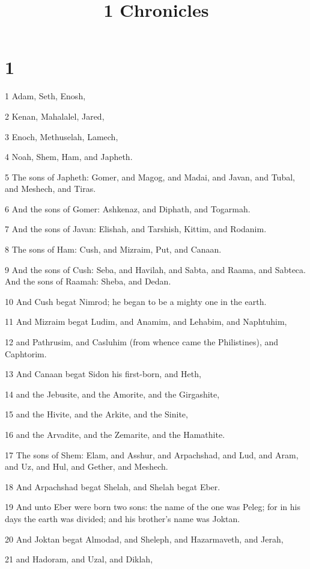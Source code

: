 

\title{1 Chronicles}

\chapter{1}

\par 1 Adam, Seth, Enosh,
\par 2 Kenan, Mahalalel, Jared,
\par 3 Enoch, Methuselah, Lamech,
\par 4 Noah, Shem, Ham, and Japheth.
\par 5 The sons of Japheth: Gomer, and Magog, and Madai, and Javan, and Tubal, and Meshech, and Tiras.
\par 6 And the sons of Gomer: Ashkenaz, and Diphath, and Togarmah.
\par 7 And the sons of Javan: Elishah, and Tarshish, Kittim, and Rodanim.
\par 8 The sons of Ham: Cush, and Mizraim, Put, and Canaan.
\par 9 And the sons of Cush: Seba, and Havilah, and Sabta, and Raama, and Sabteca. And the sons of Raamah: Sheba, and Dedan.
\par 10 And Cush begat Nimrod; he began to be a mighty one in the earth.
\par 11 And Mizraim begat Ludim, and Anamim, and Lehabim, and Naphtuhim,
\par 12 and Pathrusim, and Casluhim (from whence came the Philistines), and Caphtorim.
\par 13 And Canaan begat Sidon his first-born, and Heth,
\par 14 and the Jebusite, and the Amorite, and the Girgashite,
\par 15 and the Hivite, and the Arkite, and the Sinite,
\par 16 and the Arvadite, and the Zemarite, and the Hamathite.
\par 17 The sons of Shem: Elam, and Asshur, and Arpachshad, and Lud, and Aram, and Uz, and Hul, and Gether, and Meshech.
\par 18 And Arpachshad begat Shelah, and Shelah begat Eber.
\par 19 And unto Eber were born two sons: the name of the one was Peleg; for in his days the earth was divided; and his brother's name was Joktan.
\par 20 And Joktan begat Almodad, and Sheleph, and Hazarmaveth, and Jerah,
\par 21 and Hadoram, and Uzal, and Diklah,
